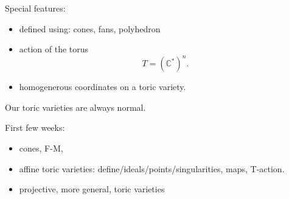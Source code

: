 \documentclass[a4paper,12pt]{amsart}
\newcommand{\CC}{\mathbb{C}}
\begin{document}
Special features:
\begin{itemize}
\item defined using: cones, fans, polyhedron
\item action of the torus
\begin{equation*}
T=(\CC^*)^n.
\end{equation*}
\item homogenerous coordinates on a toric variety.
\end{itemize}

\begin{Caution}
Our toric varieties are always normal.
\end{Caution}
First few weeks:
\begin{itemize} 
\item cones, F-M,
\item affine toric varieties: define/ideals/points/singularities, maps, T-action.
\item projective, more general, toric varieties
\end{itemize} 
\end{document}
